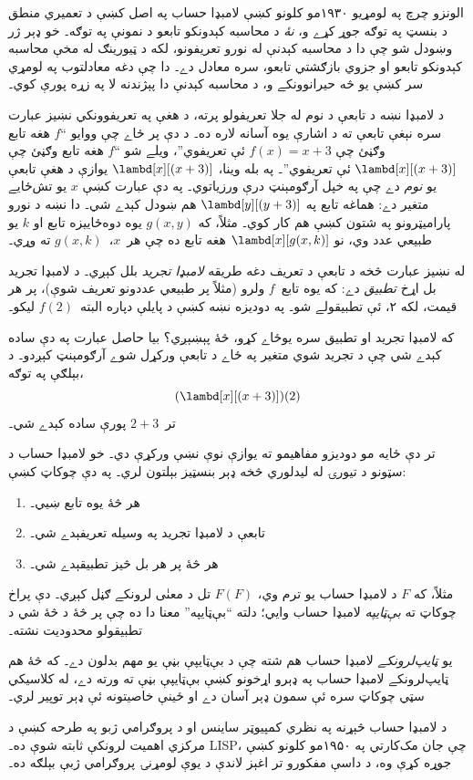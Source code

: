 \documentclass[../../../include/open-logic-section]{subfiles}
\begin{document}

الونزو چرچ په لومړيو ۱۹۳۰مو کلونو کښې لامبډا حساب په اصل کښې د
تعميري منطق د بنسټ په توګه جوړ کړے و، \emph{نۀ} د محاسبه کېدونکو
تابعو د نمونې په توګه۔ خو ډېر ژر وښودل شو چې دا د محاسبه کېدنې له
نورو تعريفونو، لکه د ټيورينګ له مخې محاسبه کېدونکو تابعو او جزوي
بازګشتي تابعو، سره معادل دے۔ دا چې دغه معادلتوب په لومړي سر کښې يو
څه حيرانوونکے و، د محاسبه کېدنې دا پېژندنه لا په زړه پورې کوي۔

د لامبډا نښه د تابعې د نوم له جلا تعريفولو پرته، د هغې په تعريفوونکي
نښيز عبارت سره نېغې تابعې ته د اشارې يوه آسانه لاره ده۔ د دې پر ځاے
چې ووايو ``$f$ هغه تابع وګڼئ چې $f(x) = x + 3$ ئې تعريفوي''، ويلے
شو ``$f$ هغه تابع وګڼئ چې $\lambd[x][(x + 3)]$ ئې تعريفوي''۔ په بله
وينا، $\lambd[x][(x+3)]$ يوازې د هغې تابعې يو \emph{نوم} دے چې په
خپل آرګومېنټ درې ورزياتوي۔ په دې عبارت کښې $x$ يو تش‌ځايے متغير دے:
هماغه تابع په $\lambd[y][(y + 3)]$ هم ښودل کېدے شي۔ دا نښه د نورو
پاراميټرونو په شتون کښې هم کار کوي۔ مثلاً، که $g(x, y)$ يوه دوه‌ځاييزه
تابع او $k$ يو طبيعي عدد وي، نو $\lambd[x][g(x,k)]$ هغه تابع ده چې
هر~$x$،~$g(x, k)$ ته وړي۔

له نښيز عبارت څخه د تابعې د تعريف دغه طريقه \emph{لامبډا تجريد}
بلل کېږي۔ د لامبډا تجريد بل اړخ \emph{تطبيق} دے: که يوه تابع~$f$
ولرو (مثلاً پر طبيعي عددونو تعريف شوې)، پر هر قيمت، لکه ۲، ئې تطبيقولے
شو۔ په دوديزه نښه کښې د پايلې دپاره البته~$f(2)$ ليکو۔

که لامبډا تجريد او تطبيق سره يوځاے کړو، څۀ پېښېږي؟ بيا حاصل عبارت
په دې ساده کېدے شي چې د تجريد شوي متغير په ځاے د تابعې ورکړل شوے
آرګومېنټ کېږدو۔ د بېلګې په توګه،
\[
(\lambd[x][(x + 3)])(2)
\]
تر~$2 + 3$ پورې ساده کېدے شي۔

تر دې ځايه مو دوديزو مفاهيمو ته يوازې نوې نښې ورکړې دي۔ خو لامبډا
حساب د سټونو د تيورۍ له ليدلوري څخه ډېر بنسټيز بېلتون لري۔ په دې
چوکاټ کښې:
\begin{enumerate}
\item هر څۀ يوه تابع ښيي۔
\item تابعې د لامبډا تجريد په وسيله تعريفېدے شي۔
\item هر څۀ پر هر بل څيز تطبيقېدے شي۔
\end{enumerate}
مثلاً، که $F$ د لامبډا حساب يو ترم وي، $F(F)$ تل د معنٰی لرونکے
ګڼل کېږي۔ دې پراخ چوکاټ ته \emph{بې‌ټايپه} لامبډا حساب وايي؛ دلته
``بې‌ټايپه'' معنا دا ده چې پر څۀ د څۀ شي د تطبيقولو محدوديت نشته۔

\begin{digress}
يو \emph{ټايپ‌لرونکے} لامبډا حساب هم شته چې د بې‌ټايپې بڼې يو مهم
بدلون دے۔ که څۀ هم ټايپ‌لرونکے لامبډا حساب په ډېرو اړخونو کښې
بې‌ټايپې بڼې ته ورته دے، له کلاسيکي سټي چوکاټ سره ئې سمون ډېر آسان
دے او ځينې خاصيتونه ئې ډېر توپير لري۔

د لامبډا حساب څېړنه په نظري کمپيوټر ساينس او د پروګرامي ژبو په
طرحه کښې د مرکزي اهميت لرونکې ثابته شوې ده۔ LISP، چې جان مک‌کارتي په ۱۹۵۰مو
کلونو کښې جوړه کړې وه، د داسې مفکورو تر اغېز لاندې د يوې لومړنۍ
پروګرامي ژبې بېلګه ده۔
\end{digress}
\end{document}
